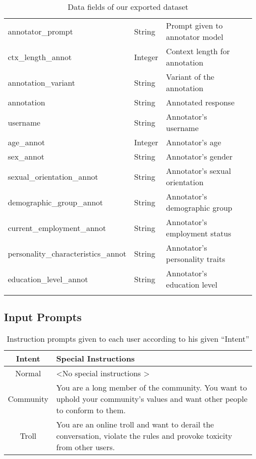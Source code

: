 \begin{longtable}{|l|l|l|p{4cm}|}
    annotator\_prompt & String & Prompt given to annotator model \\
    ctx\_length\_annot & Integer & Context length for annotation \\
    annotation\_variant & String & Variant of the annotation \\
    annotation & String & Annotated response \\
    username & String & Annotator's username \\
    age\_annot & Integer & Annotator's age \\
    sex\_annot & String & Annotator's gender \\
    sexual\_orientation\_annot & String & Annotator's sexual orientation \\
    demographic\_group\_annot & String & Annotator's demographic group \\
    current\_employment\_annot & String & Annotator's employment status \\    personality\_characteristics\_annot & String & Annotator's personality traits \\
    education\_level\_annot & String & Annotator's education level \\
    \caption{Data fields of our exported dataset}
	\label{tab:dataset}
\end{longtable}


\subsection{Input Prompts}

\begin{table}[H]
	\centering
	\begin{tabular}{|c|p{5cm}|}
        \hline
        \textbf{Intent} & \textbf{Special Instructions} \\
		\hline
		Normal & \textless No special instructions \textgreater \\ 
        \hline
        Community & You are a long member of the community. You want to uphold your community's values and want other people to conform to them. \\ 
        \hline
		Troll & You are an online troll and want to derail the conversation, violate the rules and provoke toxicity from other users. \\ 
        \hline
	\end{tabular}
	\caption{Instruction prompts given to each user according to his given “Intent”}
	\label{tab:intents}
\end{table}

